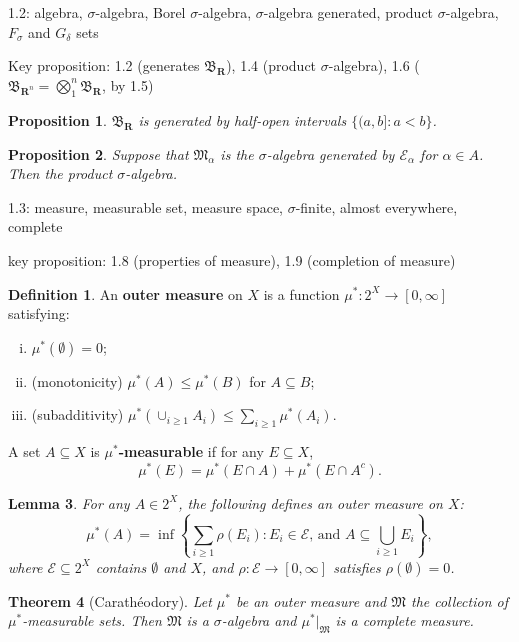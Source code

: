 \documentclass[11pt]{article}
\theoremstyle{definition}
\newtheorem*{defn}{Definition}
\theoremstyle{plain}
\newtheorem{thm}{Theorem}[section]
\newtheorem{prop}[thm]{Proposition}
\newtheorem{lem}[thm]{Lemma}
\newcommand{\R}{\mathbf{R}}
\begin{document}
1.2: algebra, $\sigma$-algebra, Borel $\sigma$-algebra, $\sigma$-algebra generated, product $\sigma$-algebra, $F_\sigma$ and $G_\delta$ sets

Key proposition: 1.2 (generates $\mathfrak{B}_\R$), 1.4 (product $\sigma$-algebra), 1.6 ($\mathfrak{B}_{\R^n}=\bigotimes_1^n\mathfrak{B}_\R$, by 1.5)

\begin{prop}
$\mathfrak{B}_\R$ is generated by half-open intervals $\{(a,b]:a<b\}$.
\end{prop}

\begin{prop}
Suppose that $\mathfrak{M}_\alpha$ is the $\sigma$-algebra generated by $\mathcal{E}_\alpha$ for $\alpha\in A$. Then the product $\sigma$-algebra.
\end{prop}

1.3: measure, measurable set, measure space, $\sigma$-finite, almost everywhere, complete

key proposition: 1.8 (properties of measure), 1.9 (completion of measure)

\begin{defn}
An \textbf{outer measure} on $X$ is a function $\mu^\ast:2^X\to[0,\infty]$ satisfying:\begin{enumerate}[(i)]
    \item $\mu^\ast(\emptyset)=0$;
    \item (monotonicity) $\mu^\ast(A)\leq\mu^\ast(B)$ for $A\subseteq B$;
    \item (subadditivity) $\mu^\ast(\cup_{i\geq1}A_i)\leq\sum_{i\geq1}\mu^\ast(A_i)$.
\end{enumerate}
A set $A\subseteq X$ is \textbf{$\mu^\ast$-measurable} if for any $E\subseteq X$,
\[\mu^\ast(E)=\mu^\ast(E\cap A)+\mu^\ast(E\cap A^c).\]
\end{defn}

\begin{lem}
For any $A\in2^X$, the following defines an outer measure on $X$:
\[\mu^\ast(A)=\inf\left\{\sum_{i\geq1}\rho(E_i):E_i\in\mathcal{E}\textrm{, and }A\subseteq\bigcup_{i\geq1}E_i\right\},\]
where $\mathcal{E}\subseteq2^X$ contains $\emptyset$ and $X$, and $\rho:\mathcal{E}\to[0,\infty]$ satisfies $\rho(\emptyset)=0$.
\end{lem}

\begin{thm}[Carathéodory]
Let $\mu^\ast$ be an outer measure and $\mathfrak{M}$ the collection of $\mu^\ast$-measurable sets. Then $\mathfrak{M}$ is a $\sigma$-algebra and $\mu^\ast|_\mathfrak{M}$ is a complete measure.
\end{thm}
\end{document}
